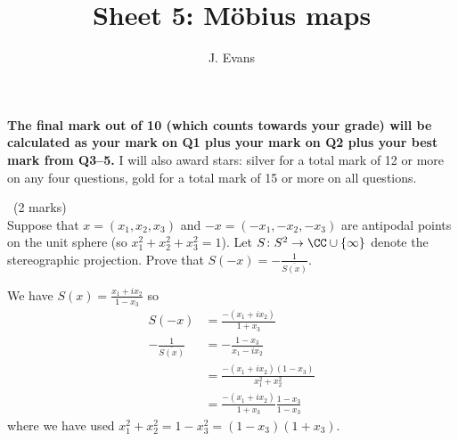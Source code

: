 \documentclass[12pt]{article}
\title{Sheet 5: M\"obius maps}
\author{J. Evans}
\date{}
\begin{document}
\maketitle

\bigskip

{\bf The final mark out of 10 (which counts towards your grade) will be calculated as your mark on Q1 plus your mark on Q2 plus your best mark from Q3--5.} I will also award stars: silver for a total mark of 12 or more on any four questions, gold for a total mark of 15 or more on all questions.

\vspace{1cm}

\begin{question}\ (2 marks)\\
Suppose that $x=(x_1,x_2,x_3)$ and $-x=(-x_1,-x_2,-x_3)$ are antipodal points on the unit sphere (so $x_1^2+x_2^2+x_3^2=1$). Let $S\colon S^2\to\CC\cup\{\infty\}$ denote the stereographic projection. Prove that $S(-x)=-\frac{1}{\overline{S(x)}}$.
\end{question}

\begin{answer}
  We have $S(x)=\frac{x_1+ix_2}{1-x_3}$ so
  \begin{align*}
    S(-x)&=\frac{-(x_1+ix_2)}{1+x_3}\\
    -\frac{1}{\overline{S(x)}}&=-\frac{1-x_3}{x_1-ix_2}\\
    &=\frac{-(x_1+ix_2)(1-x_3)}{x_1^2+x_2^2}\\
    &=\frac{-(x_1+ix_2)}{1+x_3}\frac{1-x_3}{1-x_3}
  \end{align*}
  where we have used $x_1^2+x_2^2=1-x_3^2=(1-x_3)(1+x_3)$.
\end{answer}
\newpage

\vspace{1cm}
\end{document}

